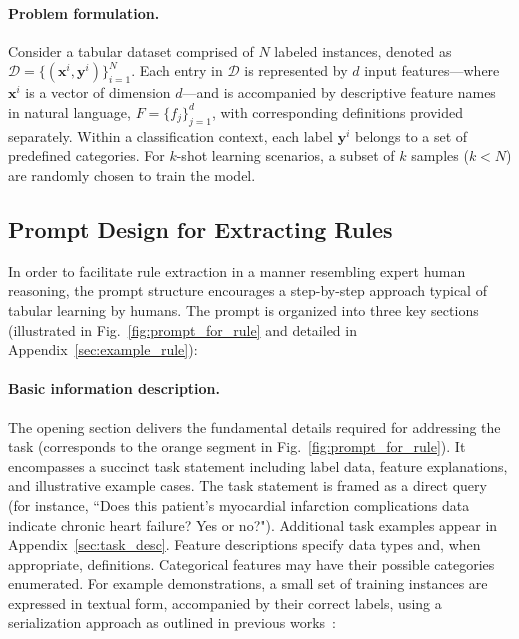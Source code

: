 \vspace*{-0.12in}
\paragraph{Problem formulation.} Consider a tabular dataset comprised of $N$ labeled instances, denoted as $\mathcal{D} = \{(\mathbf{x}^i, \mathbf{y}^i)\}_{i=1}^{N}$. Each entry in $\mathcal{D}$ is represented by $d$ input features—where $\mathbf{x}^i$ is a vector of dimension $d$—and is accompanied by descriptive feature names in natural language, $F = \{f_j\}_{j=1}^{d}$, with corresponding definitions provided separately. Within a classification context, each label $\mathbf{y}^i$ belongs to a set of predefined categories. For $k$-shot learning scenarios, a subset of $k$ samples ($k < N$) are randomly chosen to train the model.

\subsection{Prompt Design for Extracting Rules}
\label{Sec:prompt_design}
In order to facilitate rule extraction in a manner resembling expert human reasoning, the prompt structure encourages a step-by-step approach typical of tabular learning by humans. The prompt is organized into three key sections (illustrated in Fig.~\ref{fig:prompt_for_rule} and detailed in Appendix~\ref{sec:example_rule}):

\vspace*{-0.12in}
\paragraph{Basic information description.} The opening section delivers the fundamental details required for addressing the task (corresponds to the orange segment in Fig.~\ref{fig:prompt_for_rule}). It encompasses a succinct task statement including label data, feature explanations, and illustrative example cases. The task statement is framed as a direct query (for instance, ``Does this patient's myocardial infarction complications data indicate chronic heart failure? Yes or no?"). Additional task examples appear in Appendix~\ref{sec:task_desc}. Feature descriptions specify data types and, when appropriate, definitions. Categorical features may have their possible categories enumerated. For example demonstrations, a small set of training instances are expressed in textual form, accompanied by their correct labels, using a serialization approach as outlined in previous works~\cite{dinh2022lift,hegselmann2023tabllm}:

